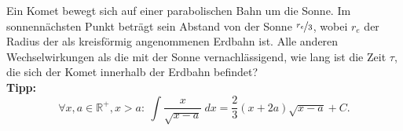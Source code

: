 \begin{Exercise}[difficulty = 3, title = Komet, origin = {Auswahlwettbewerb IPhO 2007, 3. Runde}, label = cmcomet]
	Ein Komet bewegt sich auf einer parabolischen Bahn um die Sonne. Im sonnennächsten Punkt beträgt sein Abstand von der Sonne $\nicefrac{r_e}{3}$, wobei $r_e$ der Radius der als kreisförmig angenommenen Erdbahn ist. Alle anderen Wechselwirkungen als die mit der Sonne vernachlässigend, wie lang ist die Zeit $\tau$, die sich der Komet innerhalb der Erdbahn befindet?\\
	\small{\textbf{Tipp:} \begin{equation}
		\label{cmcomet:int} \forall x,a \in \mathbb{R}^+, x>a:~
		\int \frac{x}{\sqrt{x-a}}~dx = \frac{2}{3}\left(x+2a\right)\sqrt{x-a}+C.\end{equation}}
\end{Exercise}
